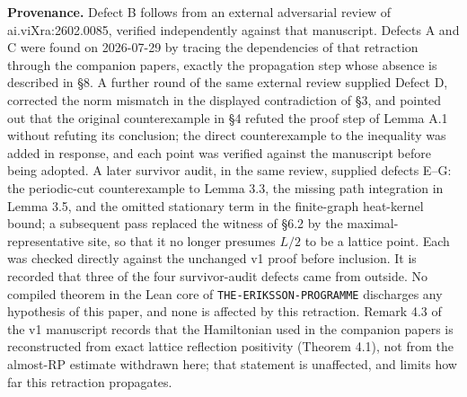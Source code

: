 \documentclass[11pt]{article}
\begin{document}
\noindent\footnotesize
\textbf{Provenance.} Defect B follows from an external adversarial review of
ai.viXra:2602.0085, verified independently against that manuscript. Defects A and C
were found on 2026-07-29 by tracing the dependencies of that retraction through the
companion papers, exactly the propagation step whose absence is described in \S8. A
further round of the same external review supplied Defect D, corrected the norm
mismatch in the displayed contradiction of \S3, and pointed out that the original
counterexample in \S4 refuted the proof step of Lemma A.1 without refuting its
conclusion; the direct counterexample to the inequality was added in response, and
each point was verified against the manuscript before being adopted. A later
survivor audit, in the same review, supplied defects E--G: the periodic-cut
counterexample to Lemma 3.3, the missing path integration in Lemma 3.5, and the
omitted stationary term in the finite-graph heat-kernel bound; a subsequent pass
replaced the witness of \S6.2 by the maximal-representative site, so that it no longer
presumes $L/2$ to be a lattice point. Each was checked directly against the unchanged
v1 proof before inclusion. It is recorded that three of the four survivor-audit
defects came from outside. No
compiled theorem in the Lean core of \texttt{THE-ERIKSSON-PROGRAMME} discharges any
hypothesis of this paper, and none is affected by this retraction. Remark 4.3 of the
v1 manuscript records that the Hamiltonian used in the companion papers is
reconstructed from exact lattice reflection positivity (Theorem 4.1), not from the
almost-RP estimate withdrawn here; that statement is unaffected, and limits how far
this retraction propagates.
\end{document}
